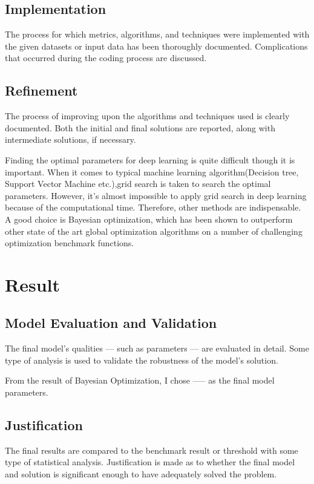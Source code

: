 \documentclass[a4paper,10pt,fleqn]{article}
\begin{document}
\subsection{Implementation}
The process for which metrics, algorithms, and techniques were implemented with the given datasets or input data has been thoroughly documented. Complications that occurred during the coding process are discussed.






\subsection{Refinement}
The process of improving upon the algorithms and techniques used is clearly documented. Both the initial and final solutions are reported, along with intermediate solutions, if necessary.

Finding the optimal parameters for deep learning is quite difficult though it is important. When it comes to typical machine learning algorithm(Decision tree, Support Vector Machine etc.),grid search is taken to search the optimal parameters. However, it's almost impossible to apply grid search in deep learning because of the computational time. Therefore, other methods are indispensable. A good choice is Bayesian optimization, which has been shown to outperform other state of the art global optimization algorithms on a number of challenging optimization benchmark functions.




\section{Result}
\subsection{Model Evaluation and Validation}
The final model’s qualities — such as parameters — are evaluated in detail. Some type of analysis is used to validate the robustness of the model’s solution.

From the result of Bayesian Optimization, I chose ----- as the final model parameters.



\subsection{Justification}
The final results are compared to the benchmark result or threshold with some type of statistical analysis. Justification is made as to whether the final model and solution is significant enough to have adequately solved the problem.
\end{document}
